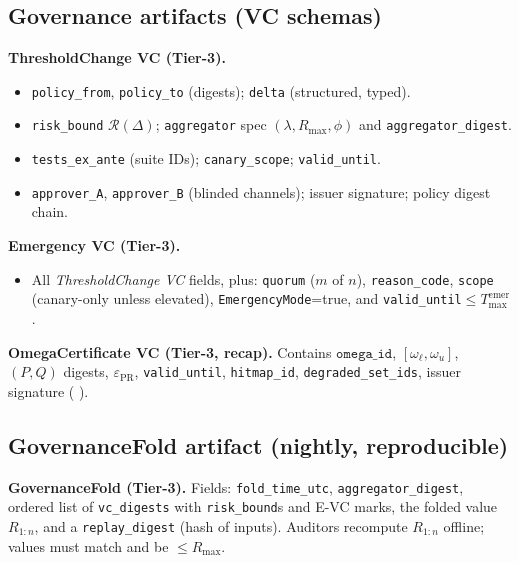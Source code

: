 \documentclass[10pt]{article}
\makeatletter
\newcommand{\JSGxref}[2]{%
  \@ifundefined{r@#2}{\textbf{[#1 ??]}}{#1~\ref{#2}}}
\newcommand{\secref}[1]{\JSGxref{§}{#1}}
\providecommand{\constsymPRmargin}{\varepsilon_{\mathrm{PR}}}
\newcommand{\epsPR}{\constsymPRmargin}
\makeatother
\begin{document}
\subsection*{Governance artifacts (VC schemas)}

\begin{ledgerbox}
\textbf{ThresholdChange VC (Tier-3).}
\begin{itemize}[leftmargin=*]
  \item \texttt{policy\_from}, \texttt{policy\_to} (digests); \texttt{delta} (structured, typed).
  \item \texttt{risk\_bound} $\mathcal R(\Delta)$; \texttt{aggregator} spec $(\lambda,R_{\max},\phi)$ and \texttt{aggregator\_digest}.
  \item \texttt{tests\_ex\_ante} (suite IDs); \texttt{canary\_scope}; \texttt{valid\_until}.
  \item \texttt{approver\_A}, \texttt{approver\_B} (blinded channels); issuer signature; policy digest chain.
\end{itemize}
\end{ledgerbox}

\begin{ledgerbox}
\textbf{Emergency VC (Tier-3).}
\begin{itemize}[leftmargin=*]
  \item All \emph{ThresholdChange VC} fields, plus: \texttt{quorum} ($m$ of $n$), \texttt{reason\_code}, \texttt{scope} (canary-only unless elevated),
        \texttt{EmergencyMode}=true, and \texttt{valid\_until}$\le T_{\mathrm{max}}^{\mathrm{emer}}$.
\end{itemize}
\end{ledgerbox}

\begin{ledgerbox}
\textbf{OmegaCertificate VC (Tier-3, recap).}
Contains $\texttt{omega\_id}$, $[\omega_\ell,\omega_u]$, $(P,Q)$ digests, $\epsPR$, \texttt{valid\_until},
\texttt{hitmap\_id}, \texttt{degraded\_set\_ids}, issuer signature (\secref{sec:omega-contract}).
\end{ledgerbox}

\subsection*{GovernanceFold artifact (nightly, reproducible)}
\begin{ledgerbox}
\textbf{GovernanceFold (Tier-3).}
Fields: \texttt{fold\_time\_utc}, \texttt{aggregator\_digest}, ordered list of \texttt{vc\_digests} with \texttt{risk\_bound}s and E-VC marks,
the folded value $R_{1:n}$, and a \texttt{replay\_digest} (hash of inputs). Auditors recompute $R_{1:n}$ offline; values must match and be $\le R_{\max}$.
\end{ledgerbox}
\end{document}
